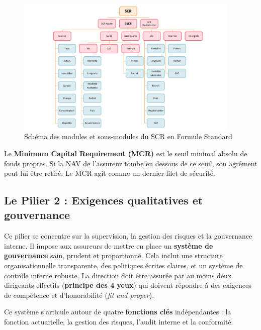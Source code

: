 \bigskip

\begin{figure}[H]
    \centering
    \includegraphics[width=0.95\textwidth]{images/2_chapitres/chapitre1/pieuvre_scr.png}
    \caption{Schéma des modules et sous-modules du SCR en Formule Standard}
    \label{fig:pieuvre_scr}
\end{figure}

Le \textbf{Minimum Capital Requirement (MCR)} est le seuil minimal absolu de fonds propres. Si la NAV de l'assureur tombe en dessous de ce seuil, son agrément peut lui être retiré. Le MCR agit comme un dernier filet de sécurité.




\subsection{Le Pilier 2 : Exigences qualitatives et gouvernance}

Ce pilier se concentre sur la supervision, la gestion des risques et la gouvernance interne. Il impose aux assureurs de mettre en place un \textbf{système de gouvernance} sain, prudent et proportionné. Cela inclut une structure organisationnelle transparente, des politiques écrites claires, et un système de contrôle interne robuste. La direction doit être assurée par au moins deux dirigeants effectifs (\textbf{principe des 4 yeux}) qui doivent répondre à des exigences de compétence et d'honorabilité (\textit{fit and proper}).

\bigskip

Ce système s'articule autour de quatre \textbf{fonctions clés} indépendantes : la fonction actuarielle, la gestion des risques, l'audit interne et la conformité.

\bigskip

